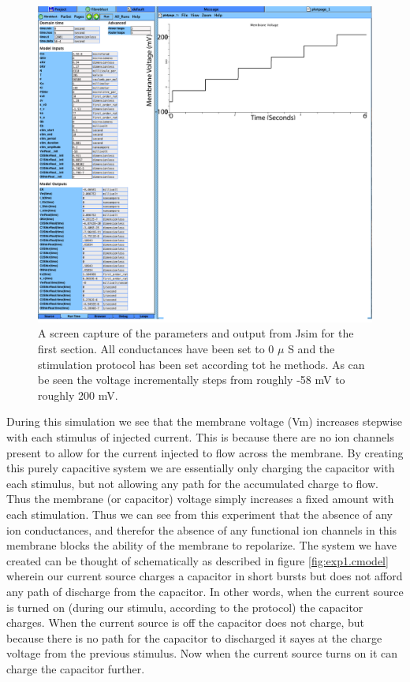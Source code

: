 \documentclass[11pt]{article}
\begin{document}
\begin{figure}[H]
	\centering
	\centering
	\includegraphics[width = .95\textwidth]{exp1.png}
	
	\caption{A screen capture of the parameters and output from Jsim for the first section. All conductances have been set to 0 \ensuremath{\mu} S and the stimulation protocol has been set according tot he methods. As can be seen the voltage incrementally steps from roughly -58 mV to roughly 200 mV. }
	\label{fig:exp1.1}
\end{figure}
\par{}
During this simulation we see that the membrane voltage (Vm) increases stepwise with each stimulus of injected current. This is because there are no ion channels present to allow for the current injected to flow across the membrane. By creating this purely capacitive system we are essentially only charging the capacitor with each stimulus, but not allowing any path for the accumulated charge to flow. Thus the membrane (or capacitor) voltage simply increases a fixed amount with each stimulation. Thus we can see from this experiment that the absence of any ion conductances, and therefor the absence of any functional ion channels in this membrane blocks the ability of the membrane to repolarize. The system we have created can be thought of schematically as described in figure \ref{fig:exp1.cmodel} wherein our current source charges a capacitor in short bursts but does not afford any path of discharge from the capacitor. In other words, when the current source is turned on (during our stimulu, according to the protocol) the capacitor charges. When the current source is off the capacitor does not charge, but because there is no path for the capacitor to discharged it sayes at the charge voltage from the previous stimulus. Now when the current source turns on it can charge the capacitor further.
\end{document}
